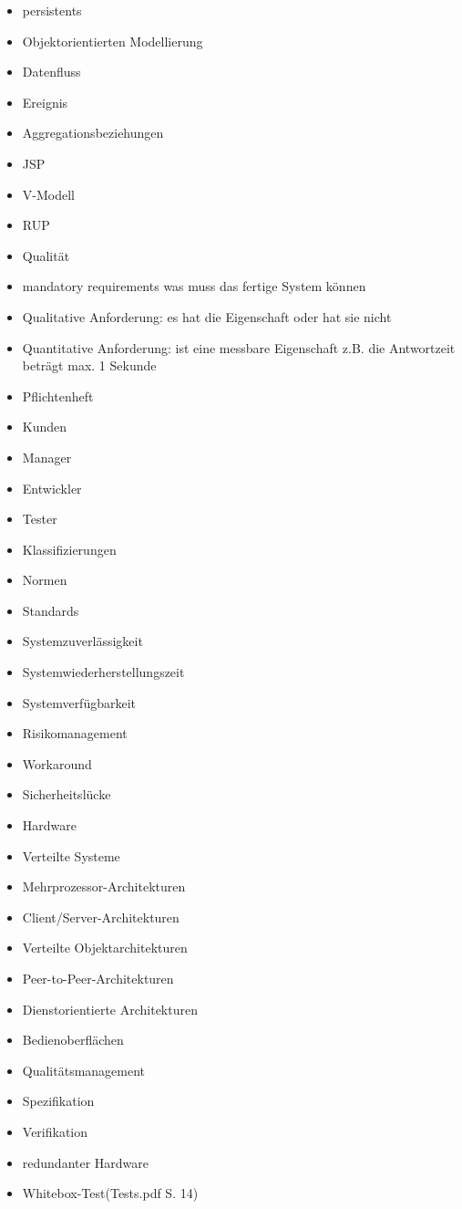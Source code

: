 \begin{itemize}
\item persistents
\item Objektorientierten Modellierung
\item Datenfluss
\item Ereignis
\item Aggregationsbeziehungen
\item JSP
\item V-Modell
\item RUP
\item Qualität
\item mandatory requirements was muss das fertige System können
\item Qualitative Anforderung: es hat die Eigenschaft oder hat sie nicht
\item Quantitative Anforderung: ist eine messbare Eigenschaft z.B. die Antwortzeit beträgt max. 1 Sekunde
\item Pflichtenheft
\item Kunden
\item Manager
\item Entwickler
\item Tester
\item Klassifizierungen
\item Normen
\item Standards
\item Systemzuverlässigkeit
\item Systemwiederherstellungszeit
\item Systemverfügbarkeit
\item Risikomanagement
\item Workaround
\item Sicherheitslücke
\item Hardware
\item Verteilte Systeme
\item Mehrprozessor-Architekturen
\item Client/Server-Architekturen
\item Verteilte Objektarchitekturen
\item Peer-to-Peer-Architekturen
\item Dienstorientierte Architekturen
\item Bedienoberflächen
\item Qualitätsmanagement
\item Spezifikation
\item Verifikation
\item redundanter Hardware
\item Whitebox-Test(Tests.pdf S. 14)

\end{itemize}
